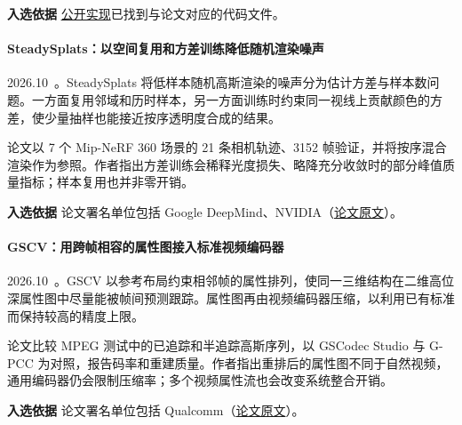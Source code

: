 \textbf{入选依据} \href{https://github.com/pengpeng-yu/cosa-gs}{公开实现}已找到与论文对应的代码文件。

\paragraph{SteadySplats：以空间复用和方差训练降低随机渲染噪声}
2026.10~\cite{2610_05576}。SteadySplats 将低样本随机高斯渲染的噪声分为估计方差与样本数问题。一方面复用邻域和历时样本，另一方面训练时约束同一视线上贡献颜色的方差，使少量抽样也能接近按序透明度合成的结果。

论文以 7 个 Mip-NeRF 360 场景的 21 条相机轨迹、3152 帧验证，并将按序混合渲染作为参照。作者指出方差训练会稀释光度损失、略降充分收敛时的部分峰值质量指标；样本复用也并非零开销。

\textbf{入选依据} 论文署名单位包括 Google DeepMind、NVIDIA（\href{https://arxiv.org/abs/2610.05576}{论文原文}）。

\paragraph{GSCV：用跨帧相容的属性图接入标准视频编码器}
2026.10~\cite{2610_07795}。GSCV 以参考布局约束相邻帧的属性排列，使同一三维结构在二维高位深属性图中尽量能被帧间预测跟踪。属性图再由视频编码器压缩，以利用已有标准而保持较高的精度上限。

论文比较 MPEG 测试中的已追踪和半追踪高斯序列，以 GSCodec Studio 与 G-PCC 为对照，报告码率和重建质量。作者指出重排后的属性图不同于自然视频，通用编码器仍会限制压缩率；多个视频属性流也会改变系统整合开销。

\textbf{入选依据} 论文署名单位包括 Qualcomm（\href{https://arxiv.org/html/2610.07795v1}{论文原文}）。
